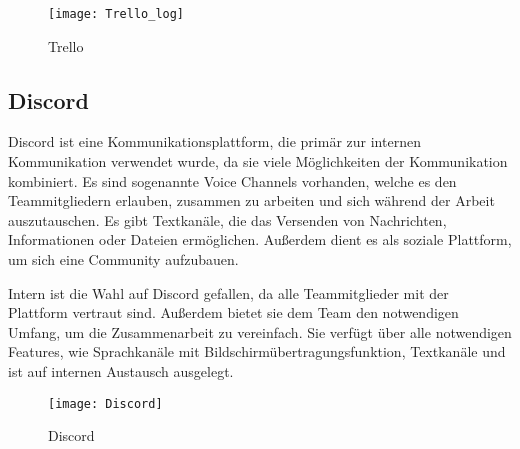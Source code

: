 \begin{figure}[H]
    \texttt{[image: Trello\_log]}
    \caption{Trello}
\end{figure}

\subsection{Discord}\label{subsec:Discord}
Discord ist eine Kommunikationsplattform, die primär zur internen Kommunikation verwendet wurde, da sie viele Möglichkeiten der Kommunikation kombiniert.
Es sind sogenannte Voice Channels vorhanden, welche es den Teammitgliedern erlauben, zusammen zu arbeiten und sich während der Arbeit auszutauschen.
Es gibt Textkanäle, die das Versenden von Nachrichten, Informationen oder Dateien ermöglichen.
Außerdem dient es als soziale Plattform, um sich eine Community aufzubauen.

Intern ist die Wahl auf Discord gefallen, da alle Teammitglieder mit der Plattform vertraut sind.
Außerdem bietet sie dem Team den notwendigen Umfang, um die Zusammenarbeit zu vereinfach.
Sie verfügt über alle notwendigen Features, wie Sprachkanäle mit Bildschirmübertragungsfunktion, Textkanäle und ist auf internen Austausch ausgelegt.

\begin{figure}[H]
    \centering
    \texttt{[image: Discord]}
    \caption{Discord}
\end{figure}
%

\renewcommand{\kapitelautor}{}
